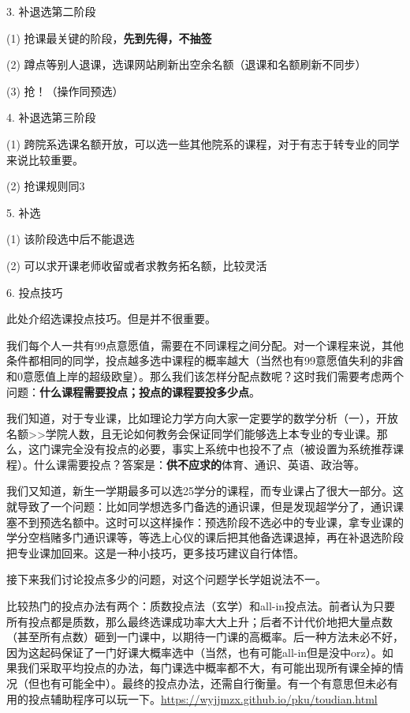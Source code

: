 \documentclass[11pt,oneside]{book}
\begin{document}
3. 补退选第二阶段

(1) 抢课最关键的阶段，\textbf{\textbf{先到先得，不抽签}}

(2) 蹲点等别人退课，选课网站刷新出空余名额（退课和名额刷新不同步）

(3) 抢！（操作同预选）

4. 补退选第三阶段

(1) 跨院系选课名额开放，可以选一些其他院系的课程，对于有志于转专业的同学来说比较重要。

(2) 抢课规则同3

5. 补选

(1) 该阶段选中后不能退选

(2) 可以求开课老师收留或者求教务拓名额，比较灵活

6. 投点技巧

此处介绍选课投点技巧。但是并不很重要。

我们每个人一共有99点意愿值，需要在不同课程之间分配。对一个课程来说，其他条件都相同的同学，投点越多选中课程的概率越大（当然也有99意愿值失利的非酋和0意愿值上岸的超级欧皇）。那么我们该怎样分配点数呢？这时我们需要考虑两个问题：\textbf{\textbf{什么课程需要投点；投点的课程要投多少点}}。

我们知道，对于专业课，比如理论力学方向大家一定要学的数学分析（一），开放名额>>学院人数，且无论如何教务会保证同学们能够选上本专业的专业课。那么，这门课完全没有投点的必要，事实上系统中也投不了点（被设置为系统推荐课程）。什么课需要投点？答案是：\textbf{\textbf{供不应求的}}体育、通识、英语、政治等。

我们又知道，新生一学期最多可以选25学分的课程，而专业课占了很大一部分。这就导致了一个问题：比如同学想选多门备选的通识课，但是发现超学分了，通识课塞不到预选名额中。这时可以这样操作：预选阶段不选必中的专业课，拿专业课的学分空档赌多门通识课等，等选上心仪的课后把其他备选课退掉，再在补退选阶段把专业课加回来。这是一种小技巧，更多技巧建议自行体悟。

接下来我们讨论投点多少的问题，对这个问题学长学姐说法不一。

比较热门的投点办法有两个：质数投点法（玄学）和all-in投点法。前者认为只要所有投点都是质数，那么最终选课成功率大大上升；后者不计代价地把大量点数（甚至所有点数）砸到一门课中，以期待一门课的高概率。后一种方法未必不好，因为这起码保证了一门好课大概率选中（当然，也有可能all-in但是没中orz）。如果我们采取平均投点的办法，每门课选中概率都不大，有可能出现所有课全掉的情况（但也有可能全中）。最终的投点办法，还需自行衡量。有一个有意思但未必有用的投点辅助程序可以玩一下。\href{https://wyjjmzx.github.io/pku/toudian.html}{https://wyjjmzx.github.io/pku/toudian.html}
\end{document}
